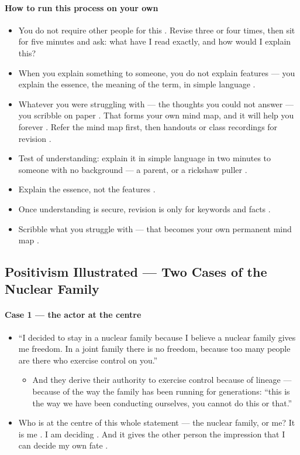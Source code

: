 \paragraph{How to run this process on your own}
\begin{itemize}
    \item You do not require other people for this . Revise three or four times, then sit for five minutes and ask: what have I read exactly, and how would I explain this? 
    \item When you explain something to someone, you do not explain features --- you explain the essence, the meaning of the term, in simple language .
    \item Whatever you were struggling with --- the thoughts you could not answer --- you scribble on paper . That forms your own mind map, and it will help you forever . Refer the mind map first, then handouts or class recordings for revision .
\end{itemize}

\begin{QuickRevision}
\begin{itemize}
    \item Test of understanding: explain it in simple language in two minutes to someone with no background --- a parent, or a rickshaw puller .
    \item Explain the essence, not the features .
    \item Once understanding is secure, revision is only for keywords and facts .
    \item Scribble what you struggle with --- that becomes your own permanent mind map .
\end{itemize}
\end{QuickRevision}

\subsection{Positivism Illustrated --- Two Cases of the Nuclear Family}

\paragraph{Case 1 --- the actor at the centre}
\begin{itemize}
    \item ``I decided to stay in a nuclear family because I believe a nuclear family gives me freedom. In a joint family there is no freedom, because too many people are there who exercise control on you.'' 
    \begin{itemize}
        \item And they derive their authority to exercise control because of lineage --- because of the way the family has been running for generations: ``this is the way we have been conducting ourselves, you cannot do this or that.'' 
    \end{itemize}
    \item Who is at the centre of this whole statement --- the nuclear family, or me? It is me . I am deciding . And it gives the other person the impression that I can decide my own fate .
\end{itemize}

